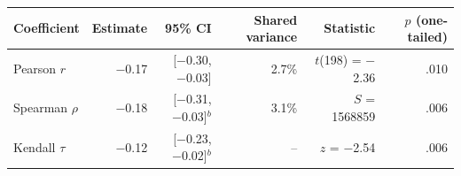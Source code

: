 \begin{tabular}{lrrrrr}
  \toprule
Coefficient & Estimate & 95\% CI & Shared variance & Statistic & $p$ (one-tailed) \\ 
  \midrule
Pearson $r$ & $-$0.17 & [$-$0.30, $-$0.03] & 2.7\% & $t$(198) = $-$2.36 & .010 \\ 
  Spearman $\rho$ & $-$0.18 & [$-$0.31, $-$0.03]$^{b}$ & 3.1\% & $S$ = 1568859 & .006 \\ 
  Kendall $\tau$ & $-$0.12 & [$-$0.23, $-$0.02]$^{b}$ & -- & $z$ = $-$2.54 & .006 \\ 
   \bottomrule
\end{tabular}
